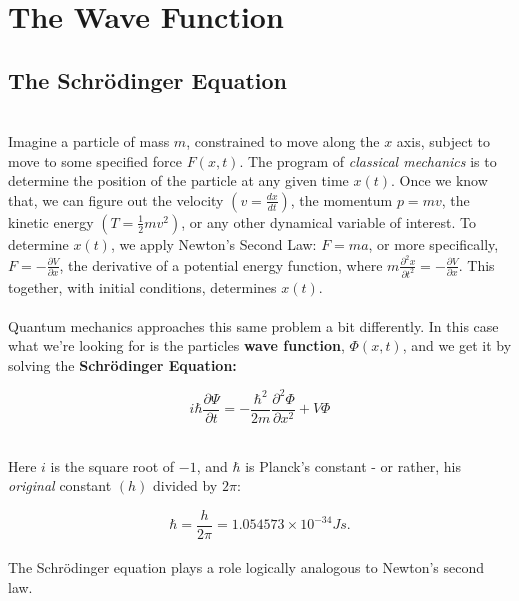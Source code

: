 \documentclass[svgnames]{article}   	%
\begin{document}
\newpage
\tableofcontents
\newpage

\section{The Wave Function}

\subsection{The Schr\"{o}dinger Equation} \mbox{}\\

Imagine a particle of mass $m$, constrained to move along the $x$ axis, subject
to move to some specified force $F(x,t)$. The program of \textit{classical
mechanics} is to determine the position of the particle at any given time
$x(t)$. Once we know that, we can figure out the velocity $(v
= \frac{dx}{dt})$, the momentum $p = mv$, the kinetic energy $(T = \frac{1}{2}mv^2)$,
or any other dynamical variable of interest. To determine $x(t)$, we apply
Newton's Second Law: $F = ma$, or more specifically, $F = -\frac{\partial
V}{\partial x}$, the derivative of a potential energy function, where
$m\frac{\partial^2 x}{\partial t^2} = - \frac{\partial V}{\partial x}$. This
together, with initial conditions, determines $x(t)$. \\\\
Quantum mechanics approaches this same problem a bit differently. In this case
what we're looking for is the particles \textbf{wave function}, $\Phi(x,t)$,
and we get it by solving the \textbf{Schr\"{o}dinger Equation:} 
\\
\begin{tcolorbox}[colback = red!5!white, colframe = red!50!black, title
  = Schr\"{o}dinger Equation]

  \[
  i\hbar\frac{\partial \Psi}{\partial t} = - \frac{\hbar^2}{2m}\frac{\partial^2
  \Phi}{\partial x^2} + V\Phi
  \] 

\end{tcolorbox} \mbox{}\\


Here $i$ is the square root of $-1$, and $\hbar$ is Planck's constant - or
rather, his \textit{original} constant $(h)$ divided by  $2\pi$: 

\[
  \hbar = \frac{h}{2\pi} = 1.054573 \times 10^{-34} J s. 
\] \\

The Schr\"{o}dinger equation plays a role logically analogous to Newton's
second law. \\
\end{document}
